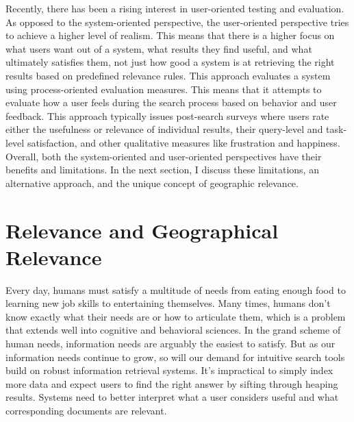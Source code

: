 Recently, there has been a rising interest in user-oriented testing and evaluation. As opposed to the system-oriented perspective, the user-oriented perspective tries to achieve a higher level of realism. This means that there is a higher focus on what users want out of a system, what results they find useful, and what ultimately satisfies them, not just how good a system is at retrieving the right results based on predefined relevance rules. This approach evaluates a system using process-oriented evaluation measures. This means that it attempts to evaluate how a user feels during the search process based on behavior and user feedback. This approach typically issues post-search surveys where users rate either the usefulness or relevance of individual results, their query-level and task-level satisfaction, and other qualitative measures like frustration and happiness. Overall, both the system-oriented and user-oriented perspectives have their benefits and limitations. In the next section, I discuss these limitations, an alternative approach, and the unique concept of geographic relevance.

\section{Relevance and Geographical Relevance}

Every day, humans must satisfy a multitude of needs from eating enough food to learning new job skills to entertaining themselves. Many times, humans don't know exactly what their needs are or how to articulate them, which is a problem that extends well into cognitive and behavioral sciences. In the grand scheme of human needs, information needs are arguably the easiest to satisfy. But as our information needs continue to grow, so will our demand for intuitive search tools build on robust information retrieval systems. It's impractical to simply index more data and expect users to find the right answer by sifting through heaping results. Systems need to better interpret what a user considers useful and what corresponding documents are relevant.

